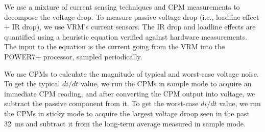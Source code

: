 We use a mixture of current sensing techniques and CPM measurements to decompose the voltage drop. To measure passive voltage drop (i.e., loadline effect + IR drop), we use VRM's current sensors. The IR drop and loadline effects are quantified using a heuristic equation verified against hardware measurements. The input to the equation is the current going from the VRM into the POWER7+ processor, sampled periodically.

We use CPMs to calculate the magnitude of typical and worst-case voltage noise. To get the typical $di/dt$ value, we run the CPMs in sample mode to acquire an immediate CPM reading, and after converting the CPM output into voltage, we subtract the passive component from it. To get the worst-case $di/dt$ value, we run the CPMs in sticky mode to acquire the largest voltage droop seen in the past 32~ms and subtract it from the long-term average measured in sample mode. 

